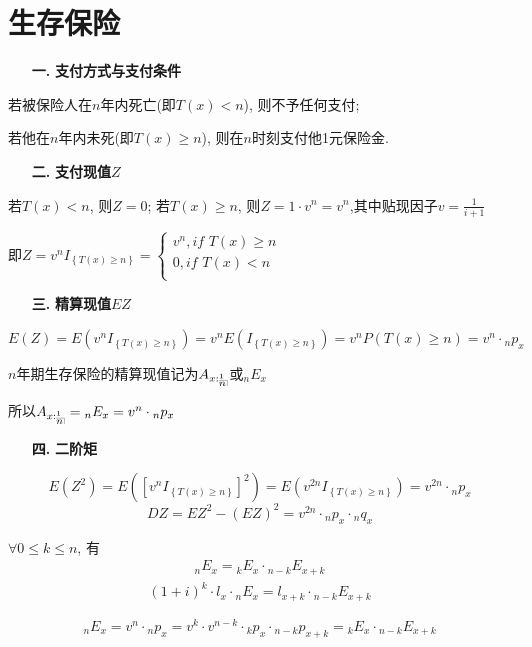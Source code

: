 \documentclass[a4paper,10pt]{ctexbook}
\makeatletter
\newcommand{\hei}{\CJKfamily{hei}}      %
\DeclareRobustCommand{\annu}[1]{_{%
    \def\arraystretch{0}%
    \setlength\arraycolsep{1pt}%
    \setlength\arrayrulewidth{.2pt}%
    \begin{array}[b]{@{}c|}\hline
        \\[\arraycolsep]%
        \scriptstyle #1%
    \end{array}%
}}
\makeatother
\begin{document}
\section{生存保险}
\begin{itemize}
    \item[{\bf\hei 一.}]{\bf\hei 支付方式与支付条件}
\end{itemize}

若被保险人在$n$年内死亡(即$T(x)<n$), 则不予任何支付;

若他在$n$年内未死(即$T(x)\geqslant n$), 则在$n$时刻支付他1元保险金.
\begin{itemize}
    \item[{\bf\hei 二.}]{\bf\hei 支付现值$Z$}
\end{itemize}

若$T(x)<n$, 则$Z=0$; 若$T(x)\geqslant n$, 则$Z=1\cdot v^n=v^n$,其中贴现因子$v=\frac{1}{i+1}$

即$Z=v^nI_{\left\{ T\left( x \right) \geqslant n \right\}}=\left\{ \begin{array}{c}
        v^n,if\,\,T\left( x \right) \geqslant n \\
        0,if\,\,T\left( x \right) <n            \\
    \end{array} \right.$
\begin{itemize}
    \item[{\bf\hei 三.}]{\bf\hei 精算现值$EZ$}
\end{itemize}

$E\left( Z \right) =E\left( v^nI_{\left\{ T\left( x \right) \geqslant n \right\}} \right) =v^nE\left( I_{\left\{ T\left( x \right) \geqslant n \right\}} \right)
    =v^nP\left( T\left( x \right) \geqslant n \right) =v^n\cdot{}_np_x$

$n$年期生存保险的精算现值记为$A_{x:\annu{n}^1}$或$_nE_x$

所以$A_{x:\annu{n}^1} = {}_nE_x=v^n\cdot{}_np_x$
\begin{itemize}
    \item[{\bf\hei 四.}]{\bf\hei 二阶矩}
\end{itemize}

$$E\left( Z^2 \right) =E\left( \left[ v^nI_{\left\{ T\left( x \right) \geqslant n \right\}} \right] ^2 \right) =E\left( v^{2n}I_{\left\{ T\left( x \right) \geqslant n \right\}} \right) =v^{2n}\cdot{}_np_x$$
$$DZ=EZ^2-\left( EZ \right) ^2=v^{2n}\cdot{}_np_x\cdot{}_nq_x$$

\begin{proposition}
    $\forall 0\leqslant k\leqslant n$, 有
    \begin{align}\label{1}
        _nE_x={}_kE_x\cdot {}_{n-k}E_{x+k}
    \end{align}
    \begin{align}\label{2}
        (1+i)^k\cdot l_x\cdot{}_nE_x=l_{x+k}\cdot {}_{n-k}E_{x+k}
    \end{align}
\end{proposition}
\proof
$$_nE_x=v^n\cdot {}_np_x=v^k\cdot v^{n-k}\cdot {}_kp_x\cdot {}_{n-k}p_{x+k}={}_kE_x\cdot {}_{n-k}E_{x+k}$$
\end{document}
